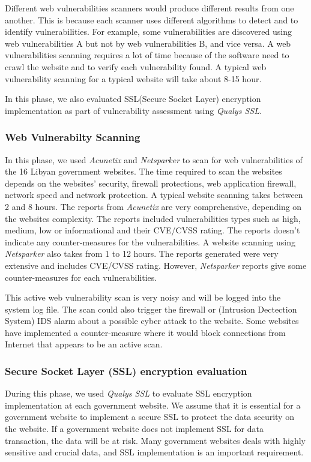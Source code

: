 \documentclass[conference]{IEEEtran}
\begin{document}
Different web vulnerabilities scanners would produce different results from one another. This is because each scanner uses different algorithms to detect and to identify vulnerabilities. For example, some vulnerabilities are discovered using web vulnerabilities A but not by web vulnerabilities B, and vice versa. A web vulnerabilities scanning requires a lot of time because of the software need to crawl the website and to verify each vulnerability found. A typical web vulnerability scanning for a typical website will take about 8-15 hour.


In this phase, we also evaluated SSL(Secure Socket Layer) encryption implementation as part of vulnerability assessment using \emph{Qualys SSL}.


\subsubsection{Web Vulnerabilty Scanning}
In this phase, we used \emph{Acunetix} and
\emph{Netsparker} to scan for web vulnerabilities
of the 16 Libyan government
websites. The time required to scan the websites depends on the websites' security, firewall protections, web application firewall, network speed and network protection. A typical website scanning
takes between 2 and 8 hours. The reports from \emph{Acunetix} are very comprehensive, depending on the websites complexity. The reports included vulnerabilities types such as high, medium, low or informational and their CVE/CVSS rating. The reports doesn't indicate any counter-measures for the vulnerabilities. A website scanning using \emph{Netsparker} also
takes from 1 to 12 hours. The reports generated
were very extensive and includes CVE/CVSS rating. However, \emph{Netsparker} reports give some counter-measures for each vulnerabilities.

This active web vulnerability scan is very noisy and will be logged into the system log file. The scan could also trigger the firewall or (Intrusion Dectection System) IDS alarm about a possible cyber attack to the website. Some websites have implemented a counter-measure where it would block connections from Internet that appears to be an active scan\cite{stuttard2011web}.

\subsubsection{Secure Socket Layer (SSL) encryption evaluation}


During this phase, we used \emph{Qualys SSL}
to evaluate SSL encryption implementation at each government  website. We assume that it is essential for a government website to implement a secure SSL to protect the data security on the website. If a government website does not implement SSL for data transaction, the data will be at risk. Many government websites deals with highly sensitive and crucial data, and  SSL implementation is an important requirement.
\end{document}
